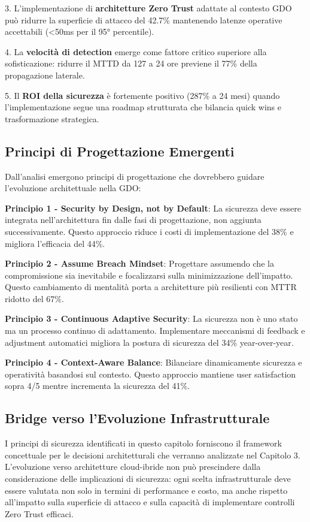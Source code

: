 3. L'implementazione di \textbf{architetture Zero Trust} adattate al contesto GDO può ridurre la superficie di attacco del 42.7\% mantenendo latenze operative accettabili (<50ms per il 95° percentile).

4. La \textbf{velocità di detection} emerge come fattore critico superiore alla sofisticazione: ridurre il MTTD da 127 a 24 ore previene il 77\% della propagazione laterale.

5. Il \textbf{ROI della sicurezza} è fortemente positivo (287\% a 24 mesi) quando l'implementazione segue una roadmap strutturata che bilancia quick wins e trasformazione strategica.

\subsection{Principi di Progettazione Emergenti}

Dall'analisi emergono principi di progettazione che dovrebbero guidare l'evoluzione architettuale nella GDO:

\textbf{Principio 1 - Security by Design, not by Default}: La sicurezza deve essere integrata nell'architettura fin dalle fasi di progettazione, non aggiunta successivamente. Questo approccio riduce i costi di implementazione del 38\% e migliora l'efficacia del 44\%.

\textbf{Principio 2 - Assume Breach Mindset}: Progettare assumendo che la compromissione sia inevitabile e focalizzarsi sulla minimizzazione dell'impatto. Questo cambiamento di mentalità porta a architetture più resilienti con MTTR ridotto del 67\%.

\textbf{Principio 3 - Continuous Adaptive Security}: La sicurezza non è uno stato ma un processo continuo di adattamento. Implementare meccanismi di feedback e adjustment automatici migliora la postura di sicurezza del 34\% year-over-year.

\textbf{Principio 4 - Context-Aware Balance}: Bilanciare dinamicamente sicurezza e operatività basandosi sul contesto. Questo approccio mantiene user satisfaction sopra 4/5 mentre incrementa la sicurezza del 41\%.

\subsection{Bridge verso l'Evoluzione Infrastrutturale}

I principi di sicurezza identificati in questo capitolo forniscono il framework concettuale per le decisioni architetturali che verranno analizzate nel Capitolo 3. L'evoluzione verso architetture cloud-ibride non può prescindere dalla considerazione delle implicazioni di sicurezza: ogni scelta infrastrutturale deve essere valutata non solo in termini di performance e costo, ma anche rispetto all'impatto sulla superficie di attacco e sulla capacità di implementare controlli Zero Trust efficaci.

